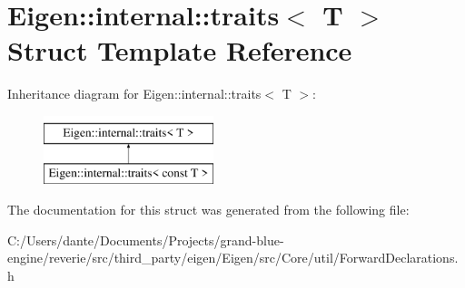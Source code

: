 \hypertarget{struct_eigen_1_1internal_1_1traits}{}\section{Eigen\+::internal\+::traits$<$ T $>$ Struct Template Reference}
\label{struct_eigen_1_1internal_1_1traits}
Inheritance diagram for Eigen\+::internal\+::traits$<$ T $>$\+:\begin{figure}[H]
\begin{center}
\leavevmode
\includegraphics[height=2.000000cm]{struct_eigen_1_1internal_1_1traits}
\end{center}
\end{figure}


The documentation for this struct was generated from the following file\+:\begin{DoxyCompactItemize}
\item 
C\+:/\+Users/dante/\+Documents/\+Projects/grand-\/blue-\/engine/reverie/src/third\+\_\+party/eigen/\+Eigen/src/\+Core/util/Forward\+Declarations.\+h\end{DoxyCompactItemize}

